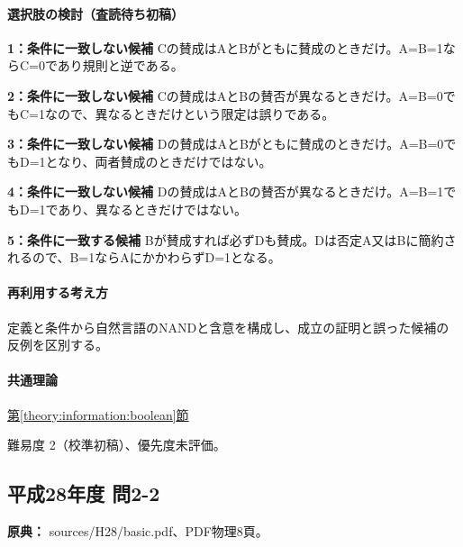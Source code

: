 \paragraph{選択肢の検討（査読待ち初稿）}\mbox{}\par

\noindent\textbf{1：条件に一致しない候補} Cの賛成はAとBがともに賛成のときだけ。A=\allowbreak{}B=\allowbreak{}1ならC=\allowbreak{}0であり規則と逆である。\par

\noindent\textbf{2：条件に一致しない候補} Cの賛成はAとBの賛否が異なるときだけ。A=\allowbreak{}B=\allowbreak{}0でもC=\allowbreak{}1なので、異なるときだけという限定は誤りである。\par

\noindent\textbf{3：条件に一致しない候補} Dの賛成はAとBがともに賛成のときだけ。A=\allowbreak{}B=\allowbreak{}0でもD=\allowbreak{}1となり、両者賛成のときだけではない。\par

\noindent\textbf{4：条件に一致しない候補} Dの賛成はAとBの賛否が異なるときだけ。A=\allowbreak{}B=\allowbreak{}1でもD=\allowbreak{}1であり、異なるときだけではない。\par

\noindent\textbf{5：条件に一致する候補} Bが賛成すれば必ずDも賛成。Dは否定A又はBに簡約されるので、B=\allowbreak{}1ならAにかかわらずD=\allowbreak{}1となる。\par

\paragraph{再利用する考え方} 定義と条件から自然言語のNANDと含意を構成し、成立の証明と誤った候補の反例を区別する。

\paragraph{共通理論} \hyperref[theory:information:boolean]{第\ref*{theory:information:boolean}節}

\par 難易度 2（校準初稿）、優先度未評価。

\subsection{平成28年度 問2-2}
\label{q:h28-reg-basic-2-2}

\noindent\textbf{原典：} sources/H28/basic.pdf、PDF物理8頁。

